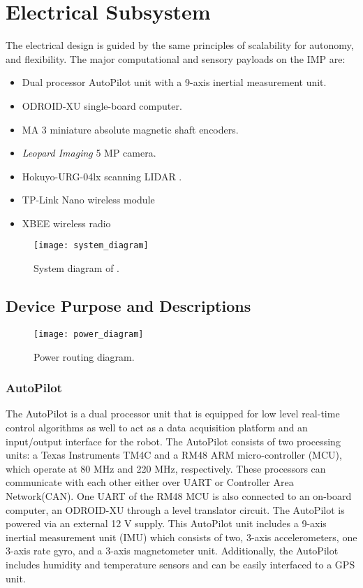 \section{Electrical Subsystem}

The electrical design is guided by the same principles of scalability for autonomy, and flexibility. The major computational and sensory payloads on the IMP are:

\begin{itemize}
\item 	Dual processor AutoPilot unit with a 9-axis inertial measurement unit.
\item  	ODROID-XU single-board computer.
\item 	MA 3 miniature absolute magnetic shaft encoders.
\item  	\textit{Leopard Imaging} 5 MP camera.
\item  	Hokuyo-URG-04lx scanning LIDAR .
\item	TP-Link Nano wireless module
\item  	XBEE wireless radio
\end{itemize}
\begin{figure}
\centering
\texttt{[image: system\_diagram]}
\caption{System diagram of \imp.}
\label{fig:system_digram}
\end{figure}


\subsection{Device Purpose and Descriptions}

\begin{figure}
\centering
\texttt{[image: power\_diagram]}
\caption{\imp Power routing diagram.}
\label{fig:power_diagram}
\end{figure}

\subsubsection{AutoPilot}

The AutoPilot is a dual processor unit that is equipped for low level real-time control algorithms as well to act as a data acquisition platform and an input/output interface for the robot. The AutoPilot consists of two processing units: a Texas Instruments TM4C and a RM48 ARM micro-controller (MCU), which operate at 80 MHz and 220 MHz, respectively. These processors can communicate with each other either over UART or Controller Area Network(CAN). One UART of the RM48 MCU is also connected to an on-board computer, an ODROID-XU through a level translator circuit. The AutoPilot is powered via an external 12 V supply. This AutoPilot unit includes a 9-axis inertial measurement unit (IMU) which consists of two, 3-axis accelerometers, one 3-axis rate gyro, and a 3-axis magnetometer unit. Additionally, the AutoPilot includes humidity and temperature sensors and can be easily interfaced to a GPS unit.

